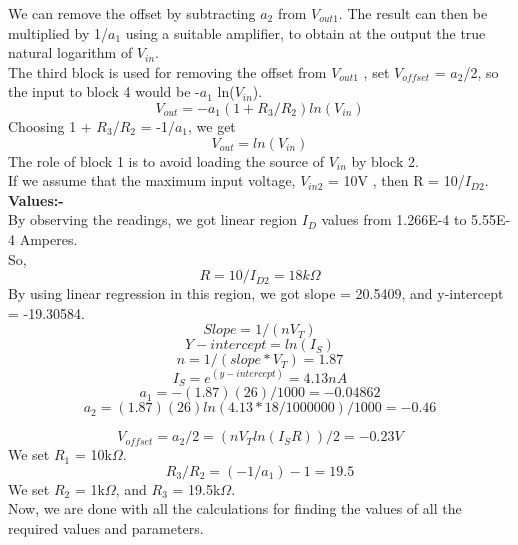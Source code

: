 \documentclass[12pt]{article}
\begin{document}
We can remove the offset by subtracting $a_2$ from $V_{out1}$. The result can then be multiplied by 1/$a_1$ using a suitable amplifier, to obtain at the output the true natural logarithm of $V_{in}$.\\
The third block is used for removing the offset from $V_{out1}$ , set $V_{offset}$ = $a_2$/2,  so the input to block 4 would be -$a_1$ ln($V_{in}$).\\
\begin{equation}
  V_{out} = -a_1(1 + R_3/R_2) ln(V_{in})  
 \end{equation}
Choosing 1 + $R_3$/$R_2$ = -1/$a_1$, we get
\begin{equation}
 V_{out} = ln(V_{in}) 
 \end{equation}
The role of block 1 is to avoid loading the source of $V_{in}$ by block 2.\\
If we assume that the maximum input voltage, $V_{in2}$ = 10V , then R = 10/$I_{D2}$.\\
\textbf{Values:-} \\
By observing the readings, we got linear region $I_D$ values from 1.266E-4 to 5.55E-4 Amperes.\\
So, 
\begin{equation}
 R =  10/I_{D2} = 18k\Omega 
 \end{equation}
By using linear regression in this region, we got slope = 20.5409, and y-intercept = -19.30584.\\
\begin{equation}
 Slope = 1/(nV_T)
 \end{equation}
\begin{equation}
 Y-intercept =  ln(I_S) 
 \end{equation}
\begin{equation}
 n  =1/(slope*V_T) = 1.87
 \end{equation}
\begin{equation}
 I_S  = e^{(y-intercept)} = 4.13nA
 \end{equation}
\begin{equation}
 a_1 = -(1.87)(26)/1000 = -0.04862
 \end{equation}
\begin{equation}
 a_2 = (1.87)(26) ln(4.13 * 18 /1000000) /1000 = -0.46
 \end{equation}

\begin{equation}
 V_{offset} = a_2/2 = (nV_T ln(I_SR))/2 = -0.23V
 \end{equation}
We set $R_1$ = 10k$\Omega $.
\begin{equation}
 R_3/R_2 = (-1/a_1) - 1 = 19.5
 \end{equation}
We set $R_2$ = 1k$\Omega $, and $R_3$ = 19.5k$\Omega $.\\
Now, we are done with all the calculations for finding the values of all the required values and parameters.
\end{document}

